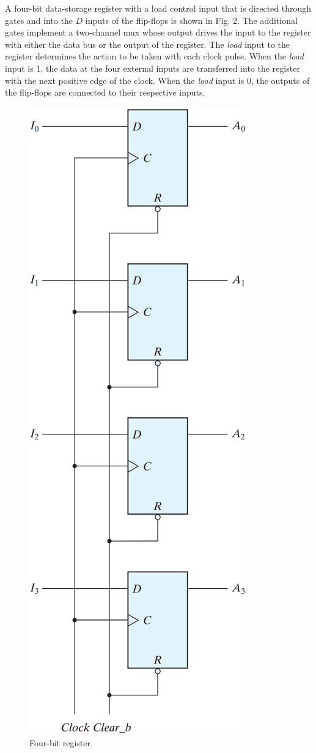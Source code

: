 A four-bit data-storage register with a load control input that is directed through gates and into the $D$ inputs of the flip-flops is shown in Fig. 2. The additional gates implement a two-channel mux whose output drives the input to the register with either the data bus or the output of the register. The \textit{load} input to the register determines the action to be taken with each clock pulse. When the \textit{load} input is 1, the data at the four external inputs are transferred into the register with the next positive edge of the clock. When the \textit{load} input is 0, the outputs of the flip-flops are connected to their respective inputs.
\begin{figure}[H]
  \centering
  \includegraphics[width=.7\linewidth]{img/fig-6.1.png}
  \caption{Four-bit register}
  \label{fig:6.1}
\end{figure}

